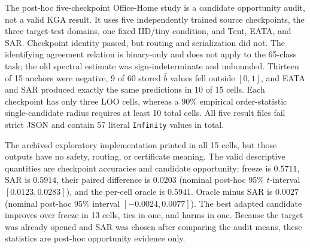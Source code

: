 \begin{table}[t]
\centering
\scriptsize
\caption{Office-Home protocols are different experiments, not conflicting versions of one row.
Entries are measured accuracy regret to the per-condition oracle; lower is better. The first row is the
canonical single-candidate KGA replay with fixed SAR. The focused route is invalid, so only the
post-hoc fixed-SAR opportunity regret ($.0027$) and freeze regret ($.0230$) are retained; its actions
have no routing or certificate interpretation. A/F/U are adapt/freeze/abstain actions.}
\label{tab:officehome-reconcile}
\end{table}

The post-hoc five-checkpoint Office-Home study is a candidate opportunity audit, not a valid KGA
result. It uses five independently trained source checkpoints, the three target-test domains, one
fixed IID/tiny condition, and Tent, EATA, and SAR. Checkpoint identity passed, but routing and
serialization did not. The identifying agreement relation is binary-only and does not apply to the
65-class task; the old spectral estimate was sign-indeterminate and unbounded. Thirteen of 15
anchors were negative, 9 of 60 stored $\widehat b$ values fell outside $[0,1]$, and EATA and SAR
produced exactly the same predictions in 10 of 15 cells. Each checkpoint has only three LOO cells,
whereas a 90\% empirical order-statistic single-candidate radius requires at least 10 total cells. All five result
files fail strict JSON and contain 57 literal \texttt{Infinity} values in total.

The archived exploratory implementation printed \abstain in all 15 cells, but those outputs
have no safety, routing, or certificate meaning. The valid descriptive quantities are checkpoint
accuracies and candidate opportunity: freeze is $0.5711$, SAR is $0.5914$, their paired difference
is $0.0203$ (nominal post-hoc 95\% $t$-interval $[0.0123,0.0283]$), and the per-cell oracle is
$0.5941$. Oracle minus SAR is $0.0027$ (nominal post-hoc 95\% interval $[-0.0024,0.0077]$).
The best adapted candidate improves over freeze
in 13 cells, ties in one, and harms in one. Because the target was already opened and SAR was chosen
after comparing the audit means, these statistics are post-hoc opportunity evidence only.

